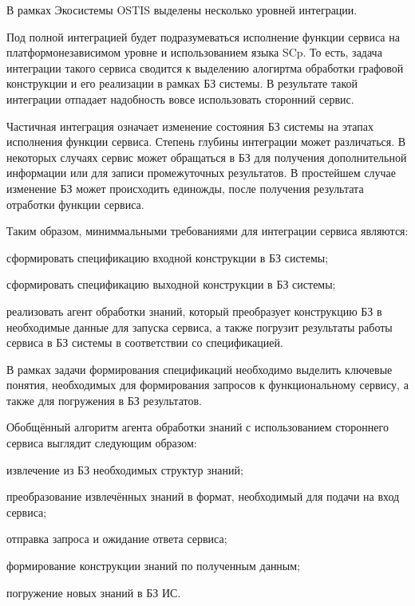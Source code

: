 В рамках Экосистемы OSTIS выделены несколько уровней интеграции. 

Под полной интеграцией будет подразумеваться исполнение функции сервиса на платформонезависимом уровне и использованием языка SCp. То есть, задача интеграции такого сервиса сводится к выделению алогиртма обработки графовой конструкции и его реализации в рамках БЗ системы. В результате такой интеграции отпадает надобность вовсе использовать сторонний сервис. 

Частичная интеграция означает изменение состояния БЗ системы на этапах исполнения функции сервиса. Степень глубины интеграции может различаться. В некоторых случаях сервис может обращаться в БЗ для получения дополнительной информации или для записи промежуточных результатов. В простейшем случае изменение БЗ может происходить единожды, после получения результата отработки функции сервиса. 

Таким образом, миниммальными требованиями для интеграции сервиса являются:
\begin{textitemize}
    \item сформировать спецификацию входной конструкции в БЗ системы;
    \item сформировать спецификацию выходной конструкции в БЗ системы;
    \item реализовать агент обработки знаний, который преобразует конструкцию БЗ в необходимые данные для запуска сервиса, а также погрузит результаты работы сервиса в БЗ системы в соответствии со спецификацией.
\end{textitemize}

В рамках задачи формирования спецификаций необходимо выделить ключевые понятия, необходимых для формирования запросов к функциональному сервису, а также для погружения в БЗ результатов.

Обобщённый алгоритм агента обработки знаний с использованием стороннего сервиса выглядит следующим образом:
\begin{textitemize}
    \item извлечение из БЗ необходимых структур знаний;
    \item преобразование извлечённых знаний в формат, необходимый для подачи на вход сервиса;
    \item отправка запроса и ожидание ответа сервиса;
    \item формирование конструкции знаний по полученным данным;
    \item погружение новых знаний в БЗ ИС.
\end{textitemize}

